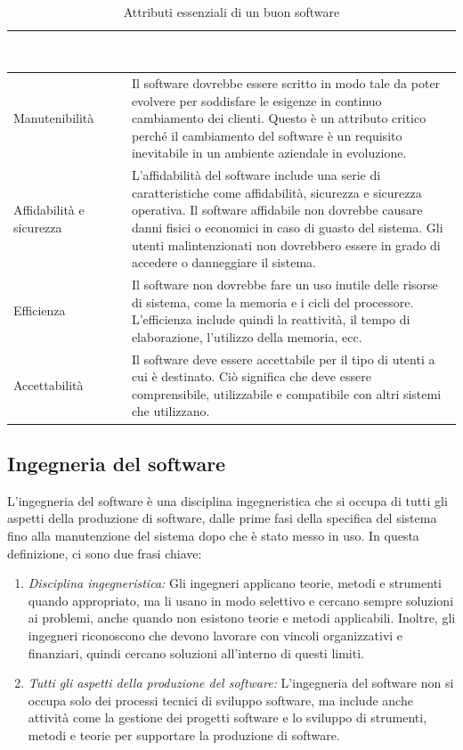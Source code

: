\begin{table}[ht]
\centering
{}
\begin{tabular}{|p{6cm}|p{9cm}|}
\hline
\rowcolor{headerblue}
\textbf{\textcolor{white}{Caratteristiche del prodotto}} & \textbf{\textcolor{white}{Descrizione}} \\
\hline
Manutenibilità & Il software dovrebbe essere scritto in modo tale da poter evolvere per soddisfare le esigenze in continuo cambiamento dei clienti. Questo è un attributo critico perché il cambiamento del software è un requisito inevitabile in un ambiente aziendale in evoluzione.
\\
\hline
Affidabilità e sicurezza & L'affidabilità del software include una serie di caratteristiche come affidabilità, sicurezza e sicurezza operativa. Il software affidabile non dovrebbe causare danni fisici o economici in caso di guasto del sistema. Gli utenti malintenzionati non dovrebbero essere in grado di accedere o danneggiare il sistema.
\\
\hline
Efficienza & Il software non dovrebbe fare un uso inutile delle risorse di sistema, come la memoria e i cicli del processore. L'efficienza include quindi la reattività, il tempo di elaborazione, l'utilizzo della memoria, ecc.
\\
\hline
Accettabilità & Il software deve essere accettabile per il tipo di utenti a cui è destinato. Ciò significa che deve essere comprensibile, utilizzabile e compatibile con altri sistemi che utilizzano.
\\
\hline
\end{tabular}
\caption{Attributi essenziali di un buon software}
\end{table}

\subsection{Ingegneria del software}
L'ingegneria del software è una disciplina ingegneristica che si occupa di tutti gli aspetti della produzione di software, dalle prime fasi della specifica del sistema fino alla manutenzione del sistema dopo che è stato messo in uso. In questa definizione, ci sono due frasi chiave:
\begin{enumerate}
    \item \textit{Disciplina ingegneristica:} Gli ingegneri applicano teorie, metodi e strumenti quando appropriato, ma li usano in modo selettivo e cercano sempre soluzioni ai problemi, anche quando non esistono teorie e metodi applicabili. Inoltre, gli ingegneri riconoscono che devono lavorare con vincoli organizzativi e finanziari, quindi cercano soluzioni all'interno di questi limiti.
    \item \textit{Tutti gli aspetti della produzione del software:} L'ingegneria del software non si occupa solo dei processi tecnici di sviluppo software, ma include anche attività come la gestione dei progetti software e lo sviluppo di strumenti, metodi e teorie per supportare la produzione di software.
\end{enumerate}

